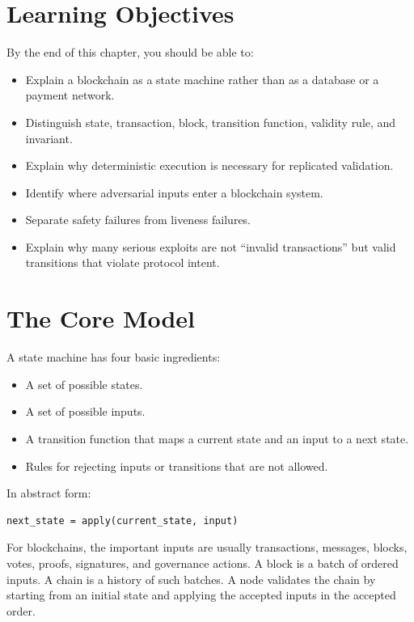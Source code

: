 \section{Learning Objectives}

By the end of this chapter, you should be able to:

\begin{itemize}
\tightlist
\item
  Explain a blockchain as a state machine rather than as a database or a
  payment network.
\item
  Distinguish state, transaction, block, transition function, validity
  rule, and invariant.
\item
  Explain why deterministic execution is necessary for replicated
  validation.
\item
  Identify where adversarial inputs enter a blockchain system.
\item
  Separate safety failures from liveness failures.
\item
  Explain why many serious exploits are not ``invalid transactions'' but
  valid transitions that violate protocol intent.
\end{itemize}

\section{The Core Model}

A state machine has four basic ingredients:

\begin{itemize}
\tightlist
\item
  A set of possible states.
\item
  A set of possible inputs.
\item
  A transition function that maps a current state and an input to a next
  state.
\item
  Rules for rejecting inputs or transitions that are not allowed.
\end{itemize}

In abstract form:

\begin{lstlisting}
next_state = apply(current_state, input)
\end{lstlisting}

For blockchains, the important inputs are usually transactions,
messages, blocks, votes, proofs, signatures, and governance actions. A
block is a batch of ordered inputs. A chain is a history of such
batches. A node validates the chain by starting from an initial state
and applying the accepted inputs in the accepted order.

